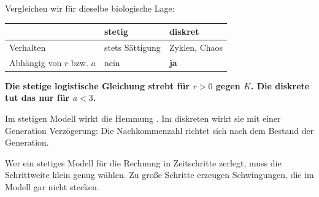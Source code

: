 \begin{warnung}
Vergleichen wir für dieselbe biologische Lage:

\begin{center}
\renewcommand{\arraystretch}{1.48}
\begin{tabular}{@{}P{2.8cm}P{2.4cm}P{2.6cm}@{}}
\toprule
& \textbf{stetig} & \textbf{diskret}\\
\midrule
Verhalten & stets Sättigung & \textcolor{akzent}{Zyklen, Chaos}\\
Abhängig von $r$ bzw. $a$ & \textcolor{gruen}{nein} & \textcolor{akzent}{\textbf{ja}}\\
\bottomrule
\end{tabular}
\end{center}

\begin{center}
\begin{minipage}{0.9\textwidth}
\textbf{Die stetige logistische Gleichung strebt für  $r > 0$ gegen $K$. Die diskrete tut das nur für $a < 3$.}
\end{minipage}
\end{center}

Im stetigen Modell wirkt die Hemmung . Im diskreten wirkt sie mit einer Generation Verzögerung: Die Nachkommenzahl richtet sich nach dem Bestand der  Generation.

\begin{center}
\begin{minipage}{0.88\textwidth}
\end{minipage}
\end{center}

Wer ein stetiges Modell für die Rechnung in Zeitschritte zerlegt, muss die Schrittweite klein genug wählen. Zu große Schritte erzeugen Schwingungen, die im Modell gar nicht stecken.

\begin{center}
\begin{minipage}{0.88\textwidth}
\end{minipage}
\end{center}
\end{warnung}

